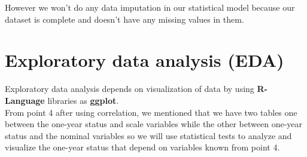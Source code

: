 \documentclass[a4paper, 11pt, oneside]{article} %
\begin{document}
However we won’t do any data imputation in our statistical model because our dataset is complete and doesn’t have any missing values in them.

\section{Exploratory data analysis (EDA)}
Exploratory data analysis depends on visualization of data by using \textbf { R-Language} libraries  as \textbf {ggplot}.\\
From point 4 after using correlation, we mentioned that we have two tables one between the one-year status and scale variables while the other between one-year status and the nominal variables so we will use statistical tests to analyze and visualize the one-year status that depend on variables known from point 4.
\end{document}
